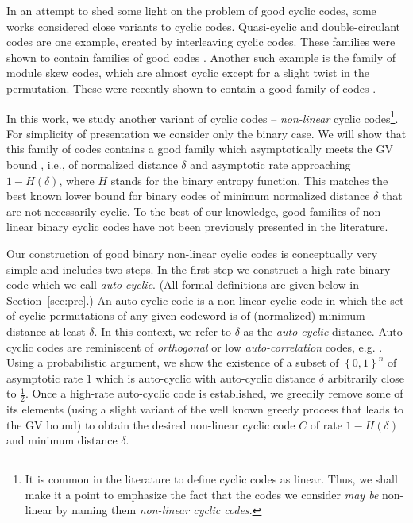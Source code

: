 \documentclass[twocolumn,twoside]{IEEEtran}
\theoremstyle{plain}
\newcommand{\mathset}[1]{\left\{#1\right\}}
\begin{document}

In an attempt to shed some light on the problem of good cyclic codes,
some works considered close variants to cyclic codes. Quasi-cyclic and
double-circulant codes are one example, created by interleaving cyclic
codes. These families were shown to contain families of good codes
\cite[Ch.~16]{macwilliams1977theory}. Another such example is the
family of module skew codes, which are almost cyclic except for a
slight twist in the permutation. These were recently shown to contain
a good family of codes \cite{alahmadi2016long}.

In this work, we study another variant of cyclic codes --
\emph{non-linear} cyclic codes\footnote{It is common in the literature
  to define cyclic codes as linear. Thus, we shall make it a point to
  emphasize the fact that the codes we consider \emph{may be}
  non-linear by naming them \emph{non-linear cyclic codes}.}. For
simplicity of presentation we consider only the binary case. We will
show that this family of codes contains a good family which asymptotically meets
the GV bound \cite{gilbert1952comparison,gilbert1957comparison}, i.e., of
normalized distance $\delta$ and asymptotic rate approaching
$1-H(\delta)$, where $H$ stands for the binary entropy function. This
matches the best known lower bound for binary codes of minimum normalized distance $\delta$ that are not
necessarily cyclic. To the best of our knowledge, good families of non-linear
binary cyclic codes have not been previously presented in the
literature.

Our construction of good binary non-linear cyclic codes is
conceptually very simple and includes two steps.  In the first step we
construct a high-rate binary code which we call \emph{auto-cyclic}.
(All formal definitions are given below in Section~\ref{sec:pre}.)  An
auto-cyclic code is a non-linear cyclic code in which 
the set of cyclic permutations of any given codeword is of (normalized) minimum distance at least $\delta$. 
In this context, we refer to $\delta$ as the
\emph{auto-cyclic} distance.  Auto-cyclic codes are reminiscent of
\emph{orthogonal} or low \emph{auto-correlation} codes,
e.g. \cite{sarwate1979bounds,chung1989optical}.  Using a probabilistic
argument, we show the existence of a subset of $\mathset{0,1}^n$ of
asymptotic rate $1$ which is auto-cyclic with auto-cyclic distance
$\delta$ arbitrarily close to $\frac{1}{2}$.  Once a high-rate
auto-cyclic code is established, we greedily remove some of its
elements (using a slight variant of the well known greedy process that
leads to the GV bound) to obtain the desired non-linear cyclic code
$C$ of rate $1-H(\delta)$ and minimum distance $\delta$.
\end{document}
